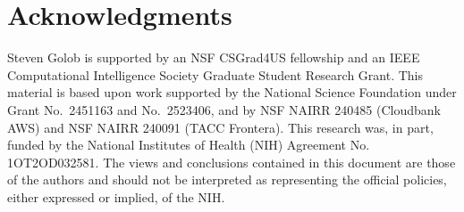 \documentclass[unnumsec,webpdf,contemporary,large]{oup-authoring-template}%
\theoremstyle{thmstyleone}%
\theoremstyle{thmstyletwo}%
\theoremstyle{thmstylethree}%
\begin{document}
\section{Acknowledgments}
Steven Golob is supported by an NSF CSGrad4US fellowship and an IEEE Computational Intelligence Society Graduate Student Research Grant. This material is based upon work supported by the National Science Foundation under Grant
No.~2451163 and No.~2523406, and by NSF NAIRR 240485 (Cloudbank AWS) and NSF NAIRR 240091 (TACC Frontera).
This research was, in part, funded by the National Institutes of Health (NIH) Agreement No. 1OT2OD032581. The views and conclusions contained in this document are those of the authors and should not be interpreted as representing the official policies, either expressed or implied, of the NIH.



\end{document}
